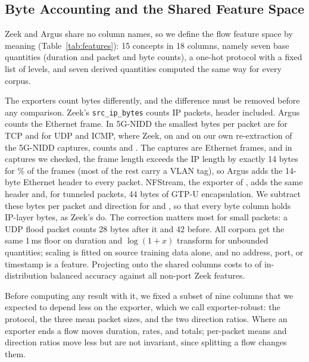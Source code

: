 \begin{table}[t]
\caption{Corpora. \DA{} supplies training and in-distribution testing on both layers; \DB{} and \DC{} are transfer targets. \DB{} also has in-target references and is the source for the reverse direction.}
\label{tab:corpora}
\centering
\footnotesize
\setlength{\tabcolsep}{1.9pt}

\end{table}

\subsection{Byte Accounting and the Shared Feature Space}
\label{sec:shared}

Zeek and Argus share no column names, so we define the flow feature space by meaning (Table~\ref{tab:features}): 15 concepts in 18 columns, namely seven base quantities (duration and packet and byte counts), a one-hot protocol with a fixed list of levels, and seven derived quantities computed the same way for every corpus.

The exporters count bytes differently, and the difference must be removed before any comparison. Zeek's \texttt{src\_ip\_bytes} counts IP packets, header included. Argus counts the Ethernet frame. In 5G-NIDD the smallest bytes per packet are \RArgMinTCP{} for TCP and \RArgMinUDP{} for UDP and ICMP, where Zeek, on \DA{} and on our own re-extraction of the 5G-NIDD captures, counts \RZkMinTCP{} and \RZkMinUDP{}. The captures are Ethernet frames, and in \RPcapEthFiles{} captures we checked, the frame length exceeds the IP length by exactly 14 bytes for \RPcapEthPct\% of the frames (most of the rest carry a VLAN tag), so Argus adds the 14-byte Ethernet header to every packet. NFStream, the exporter of \DC{}, adds the same header and, for tunneled packets, 44 bytes of GTP-U encapsulation. We subtract these bytes per packet and direction for \DB{} and \DC{}, so that every byte column holds IP-layer bytes, as Zeek's do. The correction matters most for small packets: a UDP flood packet counts 28 bytes after it and 42 before. All corpora get the same 1\,ms floor on duration and $\log(1+x)$ transform for unbounded quantities; scaling is fitted on source training data alone, and no address, port, or timestamp is a feature. Projecting \DA{} onto the shared columns costs \HarmBAmin{} to \HarmBAmax{} of in-distribution balanced accuracy against all \NFullFeat{} non-port Zeek features.

Before computing any result with it, we fixed a subset of nine columns that we expected to depend less on the exporter, which we call exporter-robust: the protocol, the three mean packet sizes, and the two direction ratios. Where an exporter ends a flow moves duration, rates, and totals; per-packet means and direction ratios move less but are not invariant, since splitting a flow changes them.

